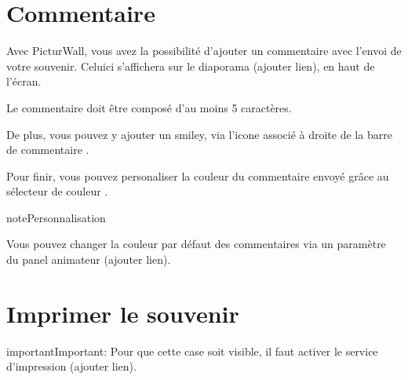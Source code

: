 \documentclass[letterpaper,10pt,french]{sphinxmanual}
\begin{document}
\begin{figure}[htbp]
\centering

\noindent{}
\end{figure}


\section{Commentaire}
\label{\detokenize{panel_invite/index:commentaire}}\label{\detokenize{panel_invite/index:invite-media-commentaire}}
\begin{figure}[htbp]
\centering

\noindent{}
\end{figure}

\sphinxAtStartPar
Avec PicturWall, vous avez la possibilité d’ajouter un commentaire avec l’envoi de votre souvenir.
Celui\sphinxhyphen{}ci s’affichera sur le diaporama (ajouter lien), en haut de l’écran.

\sphinxAtStartPar
Le commentaire doit être composé d’au moins 5 caractères.

\sphinxAtStartPar
De plus, vous pouvez y ajouter un smiley, via l’icone associé à droite de la barre de commentaire .

\sphinxAtStartPar
Pour finir, vous pouvez personaliser la couleur du commentaire envoyé grâce au sélecteur de couleur .

\begin{sphinxadmonition}{note}{Personnalisation}

\sphinxAtStartPar
Vous pouvez changer la couleur par défaut des commentaires via un paramètre du panel animateur (ajouter lien).
\end{sphinxadmonition}


\section{Imprimer le souvenir}
\label{\detokenize{panel_invite/index:imprimer-le-souvenir}}\label{\detokenize{panel_invite/index:invite-media-imprimer}}
\begin{figure}[htbp]
\centering

\noindent{}
\end{figure}

\begin{sphinxadmonition}{important}{Important:}
\sphinxAtStartPar
Pour que cette case soit visible, il faut activer le service d’impression (ajouter lien).
\end{sphinxadmonition}
\end{document}
